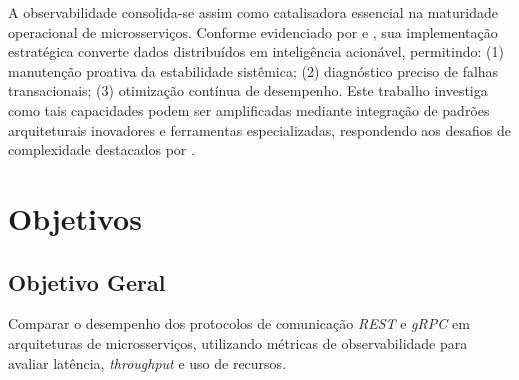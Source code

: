 A observabilidade consolida-se assim como catalisadora essencial na maturidade operacional de microsserviços. Conforme evidenciado por \cite{sandeep2022observability} e \cite{sha2023automating}, sua implementação estratégica converte dados distribuídos em inteligência acionável, permitindo: (1) manutenção proativa da estabilidade sistêmica; (2) diagnóstico preciso de falhas transacionais; (3) otimização contínua de desempenho. Este trabalho investiga como tais capacidades podem ser amplificadas mediante integração de padrões arquiteturais inovadores e ferramentas especializadas, respondendo aos desafios de complexidade destacados por \cite{shekhar2023microservices}.


\section{Objetivos}\label{sec:objetivos}

\subsection{Objetivo Geral}\label{subsec:objetivosgerais}

Comparar o desempenho dos protocolos de comunicação \textit{REST} e \textit{gRPC} em arquiteturas de microsserviços, utilizando métricas de observabilidade para avaliar latência, \textit{throughput} e uso de recursos.

